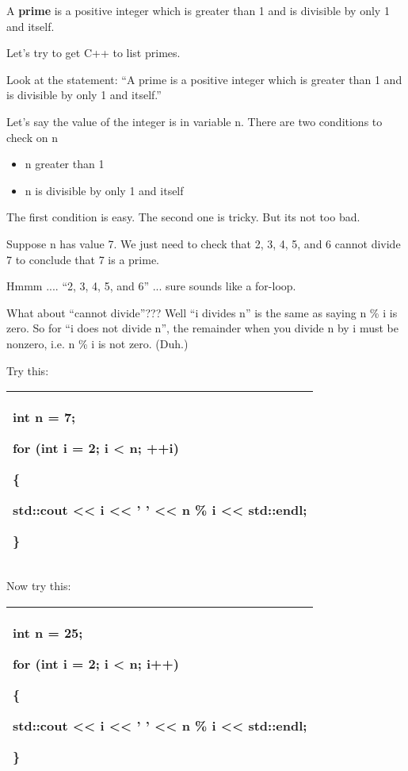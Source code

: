 \documentclass[
]{article}
\providecommand{\tightlist}{%
  \setlength{\itemsep}{0pt}\setlength{\parskip}{0pt}}
\begin{document}
A \textbf{prime} is a positive integer which is greater than 1 and is
divisible by only 1 and itself.

Let's try to get C++ to list primes.

Look at the statement: ``A prime is a positive integer which is greater
than 1 and is divisible by only 1 and itself.''

Let's say the value of the integer is in variable n. There are two
conditions to check on n

\begin{itemize}
\tightlist
\item
  n greater than 1
\item
  n is divisible by only 1 and itself
\end{itemize}

The first condition is easy. The second one is tricky. But its not too
bad.

Suppose n has value 7. We just need to check that 2, 3, 4, 5, and 6
cannot divide 7 to conclude that 7 is a prime.

Hmmm .... ``2, 3, 4, 5, and 6'' ... sure sounds like a for-loop.

What about ``cannot divide''??? Well ``i divides n'' is the same as
saying n \% i is zero. So for ``i does not divide n'', the remainder
when you divide n by i must be nonzero, i.e. n \% i is not zero. (Duh.)

Try this:

\begin{longtable}[]{@{}l@{}}
\toprule
\endhead
\begin{minipage}[t]{0.97\columnwidth}\raggedright
int n = 7;

for (int i = 2; i \textless{} n; ++i)

\{

std::cout \textless\textless{} i \textless\textless{} ' '
\textless\textless{} n \% i \textless\textless{} std::endl;

\}\strut
\end{minipage}\tabularnewline
\bottomrule
\end{longtable}

Now try this:

\begin{longtable}[]{@{}l@{}}
\toprule
\endhead
\begin{minipage}[t]{0.97\columnwidth}\raggedright
int n = 25;

for (int i = 2; i \textless{} n; i++)

\{

std::cout \textless\textless{} i \textless\textless{} ' '
\textless\textless{} n \% i \textless\textless{} std::endl;

\}\strut
\end{minipage}\tabularnewline
\bottomrule
\end{longtable}
\end{document}
